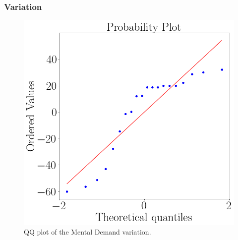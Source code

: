     \subsubsection{Variation}
        \begin{figure}[!htb]
            \begin{minipage}{0.45\linewidth}
                \centering
                \includegraphics[width = \linewidth]{Resultados/Nasa/Figuras/png/qqplot_md_var.png}
                \caption{QQ plot of the Mental Demand variation.}
                \label{fig:qqplot_bom_average}
            \end{minipage}
            \begin{minipage}{0.1\linewidth}
                \hfill
            \end{minipage}
            \begin{minipage}{0.45\linewidth}
                \centering

\end{minipage}
\end{figure}
